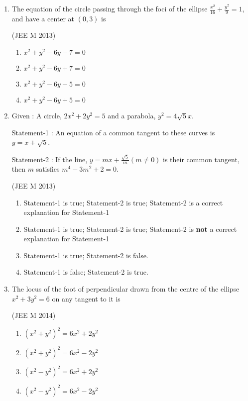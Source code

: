 \documentclass[journal,12pt,twocolumn]{IEEEtran}
\theoremstyle{remark}
\begin{document}
\begin{enumerate}
    \item The equation of the circle passing through the foci of the ellipse $\frac{x^2}{16}+\frac{y^2}{9}=1$, and have a center at $(0,3)$ is
    
    \hfill(JEE M 2013)
    
    \begin{enumerate}
    \item$x^2+y^2-6y-7=0$
    \item$x^2+y^2-6y+7=0$
    \item$x^2+y^2-6y-5=0$
    \item$x^2+y^2-6y+5=0$ 
    \end{enumerate}

    \item
    Given : A circle, $2x^2+2y^2=5$ and a parabola, $y^2=4\sqrt{5}x$.
    
    Statement-1 : An equation of a common tangent to these curves is $y=x+\sqrt{5}$.
    
    Statement-2 : If the line, $y=mx+\frac{\sqrt{5}}{m} (m\neq0)$ is their common tangent, then $m$ satisfies $m^4-3m^2+2=0$.

    \hfill(JEE M 2013)
    \begin{enumerate}
    \item Statement-1 is true; Statement-2 is true; Statement-2 is a correct explanation for Statement-1
    \item Statement-1 is true; Statement-2 is true; Statement-2 is \textbf{not} a correct explanation for Statement-1
    \item Statement-1 is true; Statement-2 is false.
    \item Statement-1 is false; Statement-2 is true.
    \end{enumerate}
        
    \item The locus of the foot of perpendicular drawn from the centre of the ellipse $x^2+3y^2=6$ on any tangent to it is
    
    \hfill(JEE M 2014)
    
    \begin{enumerate}
    \item$\left(x^2+y^2\right)^2=6x^2+2y^2$
    \item$\left(x^2+y^2\right)^2=6x^2-2y^2$
    \item$\left(x^2-y^2\right)^2=6x^2+2y^2$
    \item$\left(x^2-y^2\right)^2=6x^2-2y^2$ 
    \end{enumerate}


\end{enumerate}
\end{document}
